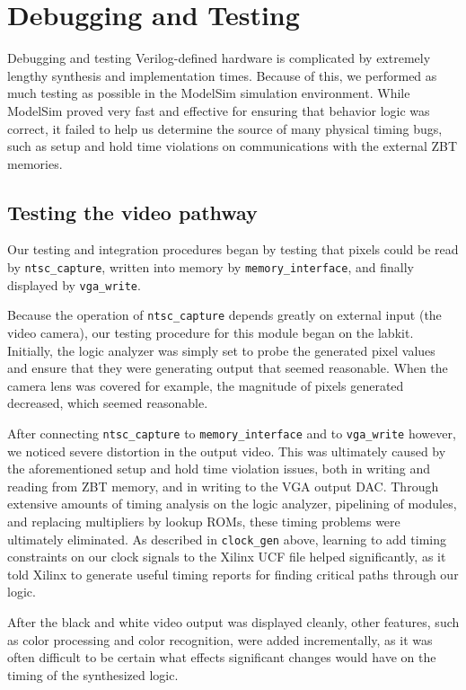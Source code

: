 \documentclass[10pt]{article}
\begin{document}
\section{Debugging and Testing}

Debugging and testing Verilog-defined hardware is complicated by extremely lengthy synthesis and implementation times. Because of this, we performed as much testing as possible in the ModelSim simulation environment. While ModelSim proved very fast and effective for ensuring that behavior logic was correct, it failed to help us determine the source of many physical timing bugs, such as setup and hold time violations on communications with the external ZBT memories.

\subsection{Testing the video pathway}
Our testing and integration procedures began by testing that pixels could be read by {\tt ntsc\_capture}, written into memory by {\tt memory\_interface}, and finally displayed by {\tt vga\_write}.

Because the operation of {\tt ntsc\_capture} depends greatly on external input (the video camera), our testing procedure for this module began on the labkit. Initially, the logic analyzer was simply set to probe the generated pixel values and ensure that they were generating output that seemed reasonable. When the camera lens was covered for example, the magnitude of pixels generated decreased, which seemed reasonable.

After connecting {\tt ntsc\_capture} to {\tt memory\_interface} and to {\tt vga\_write} however, we noticed severe distortion in the output video. This was ultimately caused by the aforementioned setup and hold time violation issues, both in writing and reading from ZBT memory, and in writing to the VGA output DAC. Through extensive amounts of timing analysis on the logic analyzer, pipelining of modules, and replacing multipliers by lookup ROMs, these timing problems were ultimately eliminated. As described in {\tt clock\_gen} above, learning to add timing constraints on our clock signals to the Xilinx UCF file helped significantly, as it told Xilinx to generate useful timing reports for finding critical paths through our logic.

After the black and white video output was displayed cleanly, other features, such as color processing and color recognition, were added incrementally, as it was often difficult to be certain what effects significant changes would have on the timing of the synthesized logic.
\end{document}
